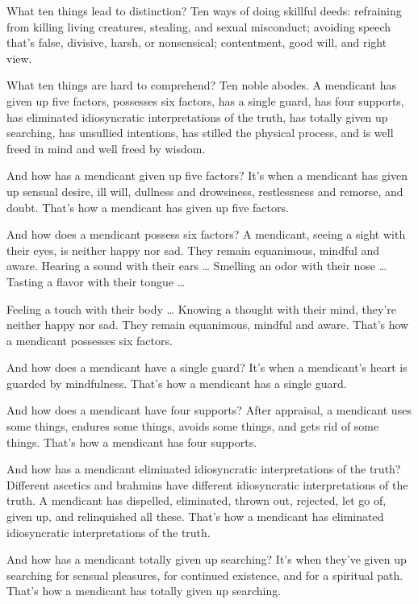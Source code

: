 \documentclass[12pt,openany]{book}%
\begin{document}
What ten things lead to distinction? Ten ways of doing skillful deeds: refraining from killing living creatures, stealing, and sexual misconduct; avoiding speech that’s false, divisive, harsh, or nonsensical; contentment, good will, and right view. 

What ten things are hard to comprehend? Ten noble abodes. A mendicant has given up five factors, possesses six factors, has a single guard, has four supports, has eliminated idiosyncratic interpretations of the truth, has totally given up searching, has unsullied intentions, has stilled the physical process, and is well freed in mind and well freed by wisdom. 

And how has a mendicant given up five factors? It’s when a mendicant has given up sensual desire, ill will, dullness and drowsiness, restlessness and remorse, and doubt. That’s how a mendicant has given up five factors. 

And how does a mendicant possess six factors? A mendicant, seeing a sight with their eyes, is neither happy nor sad. They remain equanimous, mindful and aware. Hearing a sound with their ears … Smelling an odor with their nose … Tasting a flavor with their tongue … 

Feeling a touch with their body … Knowing a thought with their mind, they’re neither happy nor sad. They remain equanimous, mindful and aware. That’s how a mendicant possesses six factors. 

And how does a mendicant have a single guard? It’s when a mendicant’s heart is guarded by mindfulness. That’s how a mendicant has a single guard. 

And how does a mendicant have four supports? After appraisal, a mendicant uses some things, endures some things, avoids some things, and gets rid of some things. That’s how a mendicant has four supports. 

And how has a mendicant eliminated idiosyncratic interpretations of the truth? Different ascetics and brahmins have different idiosyncratic interpretations of the truth. A mendicant has dispelled, eliminated, thrown out, rejected, let go of, given up, and relinquished all these. That’s how a mendicant has eliminated idiosyncratic interpretations of the truth. 

And how has a mendicant totally given up searching? It’s when they’ve given up searching for sensual pleasures, for continued existence, and for a spiritual path. That’s how a mendicant has totally given up searching. 
\end{document}
